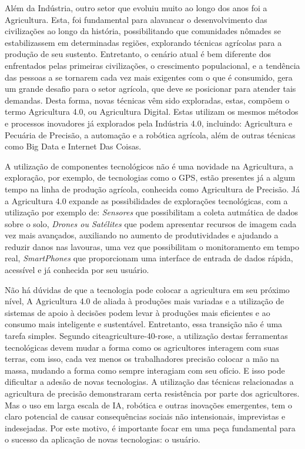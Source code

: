 \documentclass[12pt]{article}
\begin{document}
Além da Indústria, outro setor que evoluiu muito ao longo dos anos foi a Agricultura. Esta, foi fundamental para alavancar o desenvolvimento das civilizações ao longo da história, possibilitando que comunidades nômades se estabilizassem em determinadas regiões, explorando técnicas agrícolas para a produção de seu sustento. Entretanto, o cenário atual é bem diferente dos enfrentados pelas primeiras civilizações, o crescimento populacional, e a tendência das pessoas a se tornarem cada vez mais exigentes com o que é consumido, gera um grande desafio para o setor agrícola, que deve se posicionar para atender tais demandas. Desta forma, novas técnicas vêm sido exploradas, estas, compõem o termo Agricultura 4.0, ou Agricultura Digital. Estas utilizam os mesmos métodos e processos inovadores já explorados pela Indústria 4.0, incluindo: Agricultura e Pecuária de Precisão, a automação e a robótica agrícola, além de outras técnicas como Big Data e Internet Das Coisas. \cite{agricultura-40}

A utilização de componentes tecnológicos não é uma novidade na Agricultura, a exploração, por exemplo, de tecnologias como o GPS, estão presentes já a algum tempo na linha de produção agrícola, conhecida como Agricultura de Precisão. Já a Agricultura 4.0 expande as possibilidades de explorações tecnológicas, com a utilização por exemplo de: \textit{Sensores} que possibilitam a coleta autmática de dados sobre o solo, \textit{Drones ou Satélites} que podem apresentar recursos de imagem cada vez mais avançados, auxiliando no aumento de produtividades e ajudando a reduzir danos nas lavouras, uma vez que possibilitam o monitoramento em tempo real, \textit{SmartPhones} que proporcionam uma interface de entrada de dados rápida, acessível e já conhecida por seu usuário. \cite{digital-agriculture}

Não há dúvidas de que a tecnologia pode colocar a agricultura em seu próximo nível, A Agricultura 4.0 de aliada à produções mais variadas e a utilização de sistemas de apoio à decisões podem levar à produções mais eficientes e ao consumo mais inteligente e sustentável. Entretanto, essa transição não é uma tarefa simples. Segundo cite{agriculture-40-rose}, a utilização destas ferramentas tecnológicas devem mudar a forma como os agricultores interagem com suas terras, com isso, cada vez menos os trabalhadores precisão colocar a mão na massa, mudando a forma como sempre interagiam com seu ofício. E isso pode dificultar a adesão de novas tecnologias. A utilização das técnicas relacionadas a agricultura de precisão demonstraram certa resistência por parte dos agricultores. Mas o uso em larga escala de IA, robótica e outras inovações emergentes, tem o claro potencial de causar consequências sociais não intensionais, imprevistas e indesejadas. Por este motivo, é importante focar em uma peça fundamental para o sucesso da aplicação de novas tecnologias: o usuário.
\end{document}
